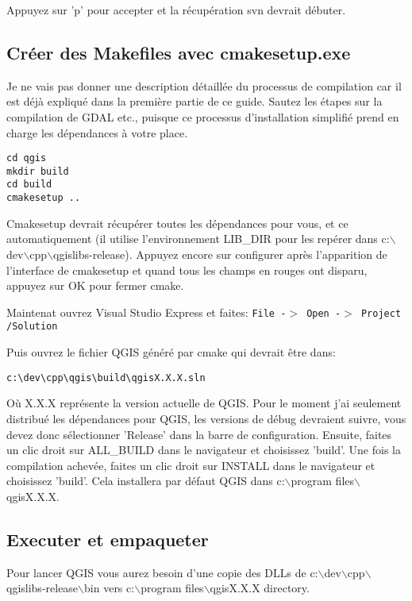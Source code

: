 Appuyez sur 'p' pour accepter et la récupération svn devrait débuter.

\subsection{Créer des Makefiles avec cmakesetup.exe}
Je ne vais pas donner une description détaillée du processus de compilation car il est déjà expliqué dans la première partie de ce guide. Sautez les étapes sur la compilation de GDAL etc., puisque ce processus d'installation simplifié prend en charge les dépendances à votre place.

\begin{verbatim}
cd qgis
mkdir build
cd build
cmakesetup ..
\end{verbatim}

Cmakesetup devrait récupérer toutes les dépendances pour vous, et ce automatiquement (il utilise l'environnement LIB\_DIR pour les repérer dans c:$\backslash$dev$\backslash$cpp$\backslash$qgislibs-release). 
Appuyez encore sur configurer après l'apparition de l'interface de cmakesetup et quand tous les champs en rouges ont disparu, appuyez sur OK pour fermer cmake.

Maintenat ouvrez Visual Studio Express et faites: \texttt{File -$>$ Open -$>$ Project /Solution}

Puis ouvrez le fichier QGIS généré par cmake qui devrait être dans:

\begin{verbatim}
c:\dev\cpp\qgis\build\qgisX.X.X.sln
\end{verbatim}

Où X.X.X représente la version actuelle de QGIS. Pour le moment j'ai seulement distribué les dépendances pour QGIS, les versions de débug devraient suivre, vous devez donc sélectionner 'Release' dans la barre de configuration. Ensuite, faites un clic droit sur ALL\_BUILD dans le navigateur et choisissez 'build'. Une fois la compilation achevée, faites un clic droit sur INSTALL dans le navigateur et choisissez 'build'. Cela installera par défaut QGIS dans c:$\backslash$program files$\backslash$qgisX.X.X.

\subsection{Executer et empaqueter}
Pour lancer QGIS vous aurez besoin d'une copie des DLLs de c:$\backslash$dev$\backslash$cpp$\backslash$qgislibs-release$\backslash$bin vers c:$\backslash$program files$\backslash$qgisX.X.X directory.